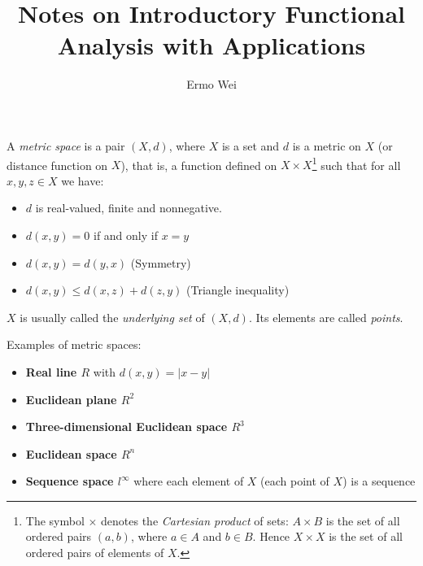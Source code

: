 \documentclass[9pt]{article}
\begin{document}
\title{Notes on Introductory Functional Analysis with Applications}
\author{Ermo Wei}
\date{}

\maketitle

\tableofcontents
\hypersetup{colorlinks=blue}

\clearpage 

 A \textit{metric space} is a pair \( (X,d)\), where \(X\) is a set and \(d\) is a metric on \(X\) (or distance function on \(X\)), that is, a function defined on \(X \times X\)\footnote{The symbol \(\times\) denotes the \textit{Cartesian product} of sets: \(A\times B\) is the set of all ordered pairs \( (a,b)\), where \(a \in A\) and \(b \in B\). Hence \(X\times X\) is the set of all ordered pairs of elements of \(X\).} such that for all \(x,y,z \in X\) we have:
\begin{itemize}
\item \(d\) is real-valued, finite and nonnegative.
\item \(d(x,y) = 0\) if and only if  \(x=y\)
\item \(d(x,y)=d(y,x)\) \qquad (Symmetry)
\item \(d(x,y) \le d(x,z) + d(z,y)\) \qquad (Triangle inequality)
\end{itemize}

\(X\) is usually called the \textit{underlying set} of \((X,d)\). Its elements are called \textit{points}.

Examples of metric spaces:
\begin{itemize}
\item \textbf{Real line \(R\)} with \(d(x,y) = |x-y|\)
\item \textbf{Euclidean plane \(R^2\)} 
\item \textbf{Three-dimensional Euclidean space \(R^3\)} 
\item \textbf{Euclidean space \(R^n\)} 
\item \textbf{Sequence space \(l^\infty\)} where each element of \(X\) (each point of \(X\)) is a sequence
\end{itemize}
\end{document}
